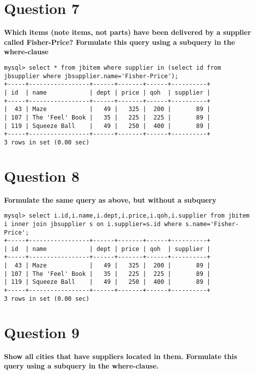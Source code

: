 \documentclass{article}
\begin{document}
\section*{Question 7}
\textbf{Which items (note items, not parts) have been delivered by a supplier called Fisher-Price? Formulate this query using a subquery in the where-clause}

\begin{lstlisting}
mysql> select * from jbitem where supplier in (select id from jbsupplier where jbsupplier.name='Fisher-Price');
+-----+-----------------+------+-------+------+----------+
| id  | name            | dept | price | qoh  | supplier |
+-----+-----------------+------+-------+------+----------+
|  43 | Maze            |   49 |   325 |  200 |       89 |
| 107 | The 'Feel' Book |   35 |   225 |  225 |       89 |
| 119 | Squeeze Ball    |   49 |   250 |  400 |       89 |
+-----+-----------------+------+-------+------+----------+
3 rows in set (0.00 sec)
\end{lstlisting}

\section*{Question 8}
\textbf{Formulate the same query as above, but without a subquery}

\begin{lstlisting}
mysql> select i.id,i.name,i.dept,i.price,i.qoh,i.supplier from jbitem i inner join jbsupplier s on i.supplier=s.id where s.name='Fisher-Price';
+-----+-----------------+------+-------+------+----------+
| id  | name            | dept | price | qoh  | supplier |
+-----+-----------------+------+-------+------+----------+
|  43 | Maze            |   49 |   325 |  200 |       89 |
| 107 | The 'Feel' Book |   35 |   225 |  225 |       89 |
| 119 | Squeeze Ball    |   49 |   250 |  400 |       89 |
+-----+-----------------+------+-------+------+----------+
3 rows in set (0.00 sec)

\end{lstlisting}

\pagebreak

\section*{Question 9}
\textbf{Show all cities that have suppliers located in them. Formulate this query using a subquery in the where-clause.}
\end{document}
